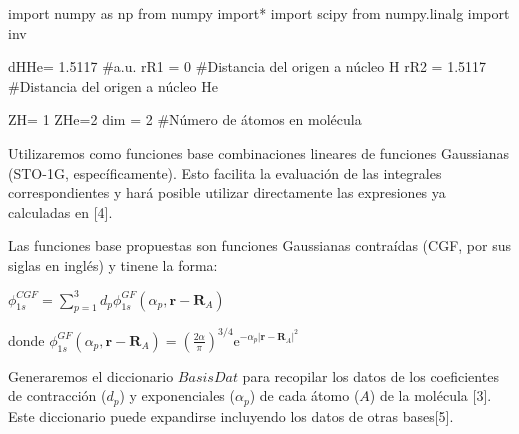 \documentclass[
  letterpaper,
  DIV=11,
  numbers=noendperiod]{scrreprt}
\newenvironment{Shaded}{\begin{snugshade}}{\end{snugshade}}
\newcommand{\CommentTok}[1]{\textcolor[rgb]{0.37,0.37,0.37}{#1}}
\newcommand{\DecValTok}[1]{\textcolor[rgb]{0.68,0.00,0.00}{#1}}
\newcommand{\FloatTok}[1]{\textcolor[rgb]{0.68,0.00,0.00}{#1}}
\newcommand{\ImportTok}[1]{\textcolor[rgb]{0.00,0.46,0.62}{#1}}
\newcommand{\NormalTok}[1]{\textcolor[rgb]{0.00,0.23,0.31}{#1}}
\newcommand{\OperatorTok}[1]{\textcolor[rgb]{0.37,0.37,0.37}{#1}}
\begin{document}
\begin{Shaded}
\begin{Highlighting}[]
\ImportTok{import}\NormalTok{ numpy }\ImportTok{as}\NormalTok{ np}
\ImportTok{from}\NormalTok{ numpy }\ImportTok{import}\OperatorTok{*}
\ImportTok{import}\NormalTok{ scipy}
\ImportTok{from}\NormalTok{ numpy.linalg }\ImportTok{import}\NormalTok{ inv}
\end{Highlighting}
\end{Shaded}

\begin{Shaded}
\begin{Highlighting}[]
\NormalTok{dHHe}\OperatorTok{=} \FloatTok{1.5117} \CommentTok{\#a.u.}
\NormalTok{rR1 }\OperatorTok{=} \DecValTok{0} \CommentTok{\#Distancia del origen a núcleo H}
\NormalTok{rR2 }\OperatorTok{=} \FloatTok{1.5117}  \CommentTok{\#Distancia del origen a núcleo He}

\NormalTok{ZH}\OperatorTok{=} \DecValTok{1}
\NormalTok{ZHe}\OperatorTok{=}\DecValTok{2}
\NormalTok{dim }\OperatorTok{=} \DecValTok{2} \CommentTok{\#Número de átomos en molécula}
\end{Highlighting}
\end{Shaded}

Utilizaremos como funciones base combinaciones lineares de funciones
Gaussianas (STO-1G, específicamente). Esto facilita la evaluación de las
integrales correspondientes y hará posible utilizar directamente las
expresiones ya calculadas en {[}4{]}.

Las funciones base propuestas son funciones Gaussianas contraídas (CGF,
por sus siglas en inglés) y tinene la forma:

\(\phi^{CGF}_{1s}= \sum^3_{p=1} d_p \phi^{GF}_{1s}(\alpha_p, \textbf{r}-\textbf{R}_A )\)

donde
\(\phi^{GF}_{1s}(\alpha_p, \textbf{r}-\textbf{R}_A ) = \left( \frac{2 \alpha}{\pi} \right)^{3/4} \mathrm{e}^{-\alpha_p|\textbf{r}-\textbf{R}_A|^2}\)

Generaremos el diccionario \(BasisDat\) para recopilar los datos de los
coeficientes de contracción (\(d_p\)) y exponenciales (\(\alpha_p\)) de
cada átomo (\(A\)) de la molécula {[}3{]}. Este diccionario puede
expandirse incluyendo los datos de otras bases{[}5{]}.
\end{document}
